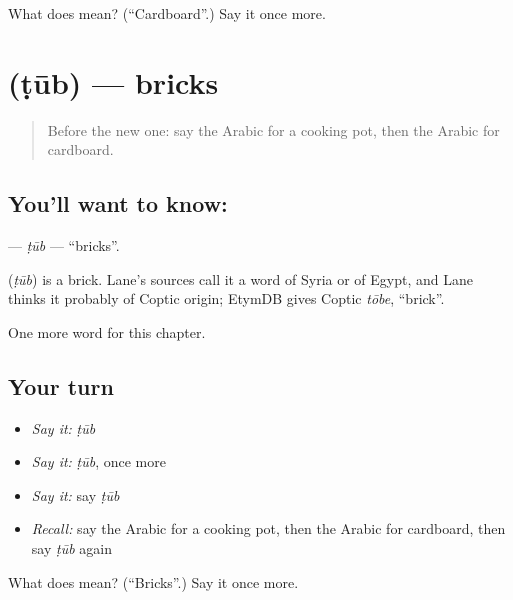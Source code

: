 \begin{tcolorbox}[breakable,colback=teal!4,colframe=teal!35!black,title={Before you move on}]
What does  mean? (\textquotedblleft{}Cardboard\textquotedblright{}.) Say it once more.
\end{tcolorbox}
\section[\texorpdfstring{\ar{طوب} (ṭūb)}{طوب (ṭūb)}]{ (ṭūb) — bricks}

\label{lesson:AR-C250-tub}



\begin{quote}
Before the new one: say the Arabic for a cooking pot, then the Arabic for cardboard.
\end{quote}

\subsection*{You'll want to know: }
\textbf{} — \emph{ṭūb} — \textquotedblleft{}bricks\textquotedblright{}.

\begin{cousinweb}
\textbf{} (\emph{ṭūb}) is a brick. Lane's sources call it a word of Syria or of Egypt, and Lane thinks it probably of Coptic origin; EtymDB gives Coptic \emph{tōbe}, \textquotedblleft{}brick\textquotedblright{}.
\end{cousinweb}

\begin{grammarlens}[title={What you've built}]
One more word for this chapter.
\end{grammarlens}

\subsection*{Your turn}
\begin{itemize}
\raggedright
  \item \emph{Say it:} \emph{ṭūb}
  \item \emph{Say it:} \emph{ṭūb}, once more
  \item \emph{Say it:} say \emph{ṭūb}
  \item \emph{Recall:} say the Arabic for a cooking pot, then the Arabic for cardboard, then say \emph{ṭūb} again
\end{itemize}

\begin{tcolorbox}[breakable,colback=teal!4,colframe=teal!35!black,title={Before you move on}]
What does  mean? (\textquotedblleft{}Bricks\textquotedblright{}.) Say it once more.
\end{tcolorbox}
